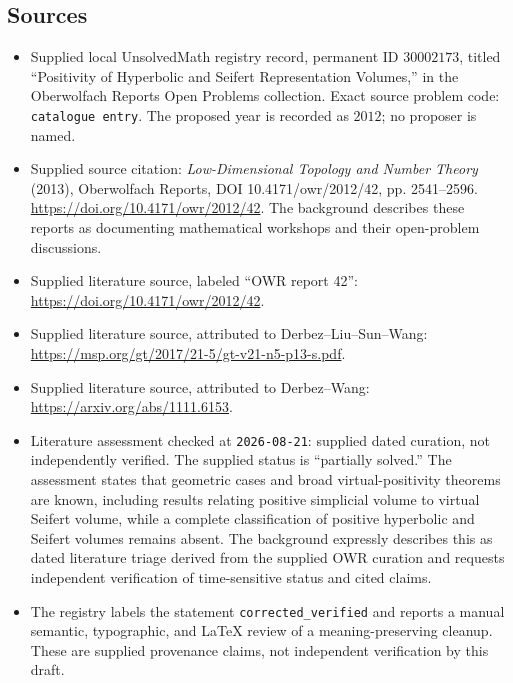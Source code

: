 \documentclass[11pt]{article}
\begin{document}
\subsection{Sources}
\begin{itemize}
\item Supplied local UnsolvedMath registry record, permanent ID \(30002173\), titled ``Positivity of Hyperbolic and Seifert Representation Volumes,'' in the Oberwolfach Reports Open Problems collection. Exact source problem code: \texttt{catalogue entry}. The proposed year is recorded as \(2012\); no proposer is named.
\item Supplied source citation: \emph{Low-Dimensional Topology and Number Theory} (2013), Oberwolfach Reports, DOI 10.4171/owr/2012/42, pp. 2541--2596. \url{https://doi.org/10.4171/owr/2012/42}. The background describes these reports as documenting mathematical workshops and their open-problem discussions.
\item Supplied literature source, labeled ``OWR report 42'': \url{https://doi.org/10.4171/owr/2012/42}.
\item Supplied literature source, attributed to Derbez--Liu--Sun--Wang: \url{https://msp.org/gt/2017/21-5/gt-v21-n5-p13-s.pdf}.
\item Supplied literature source, attributed to Derbez--Wang: \url{https://arxiv.org/abs/1111.6153}.
\item Literature assessment checked at \texttt{2026-08-21}: supplied dated curation, not independently verified. The supplied status is ``partially solved.'' The assessment states that geometric cases and broad virtual-positivity theorems are known, including results relating positive simplicial volume to virtual Seifert volume, while a complete classification of positive hyperbolic and Seifert volumes remains absent. The background expressly describes this as dated literature triage derived from the supplied OWR curation and requests independent verification of time-sensitive status and cited claims.
\item The registry labels the statement \texttt{corrected\_verified} and reports a manual semantic, typographic, and LaTeX review of a meaning-preserving cleanup. These are supplied provenance claims, not independent verification by this draft.
\end{itemize}
\end{document}
